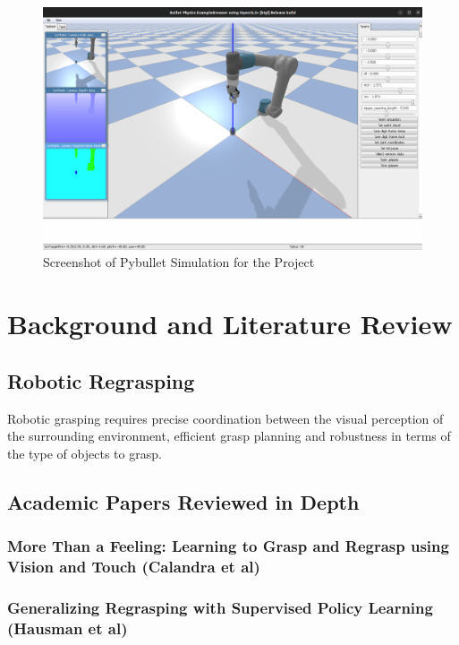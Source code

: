 \documentclass[a4paper]{report}
\theoremstyle{definition}
\begin{document}
\begin{figure}[H]
    \centering
    \includegraphics[scale=0.2]{docs/Project Report/Media/pybullet_sim.png}
    \caption{Screenshot of Pybullet Simulation for the Project}
    \label{fig:pb_sim_eg}
\end{figure}


\chapter{Background and Literature Review}
\label{chap:2}
\section{Robotic Regrasping}
\label{sec:2.1}
Robotic grasping requires precise coordination between the visual perception of the surrounding environment, efficient grasp planning and robustness in terms of the type of objects to grasp. 
\section{Academic Papers Reviewed in Depth}
\label{}
\subsection{More Than a Feeling: Learning to Grasp and Regrasp using Vision and Touch (Calandra et al)\cite{calandra}}
\label{}
\subsection{Generalizing Regrasping with Supervised Policy Learning (Hausman et al)\cite{hausman}}
\label{}
\end{document}
